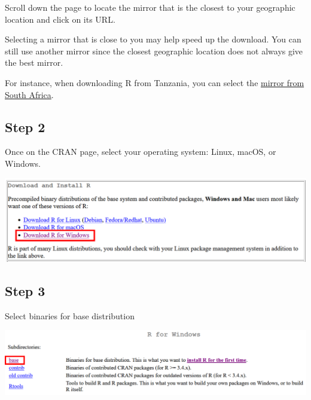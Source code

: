 \documentclass[
  letterpaper,
  DIV=11,
  numbers=noendperiod,
  oneside]{scrreprt}
\begin{document}
Scroll down the page to locate the mirror that is the closest to your
geographic location and click on its URL.

\begin{tcolorbox}[enhanced jigsaw, coltitle=black, opacityback=0, title=\textcolor{quarto-callout-tip-color}{\faLightbulb}\hspace{0.5em}{Tip}, toprule=.15mm, bottomtitle=1mm, colbacktitle=quarto-callout-tip-color!10!white, colframe=quarto-callout-tip-color-frame, left=2mm, opacitybacktitle=0.6, bottomrule=.15mm, arc=.35mm, toptitle=1mm, colback=white, titlerule=0mm, breakable, leftrule=.75mm, rightrule=.15mm]

Selecting a mirror that is close to you may help speed up the download.
You can still use another mirror since the closest geographic location
does not always give the best mirror.

\end{tcolorbox}

For instance, when downloading R from Tanzania, you can select the
\href{https://cran.mirror.ac.za/}{mirror from South Africa}.

\subsection{Step 2}

Once on the CRAN page, select your operating system: Linux, macOS, or
Windows.

\includegraphics{images/paste-23A4B16E.png}

\subsection{Step 3}

Select binaries for base distribution

\includegraphics{images/paste-0739A4C1.png}
\end{document}
